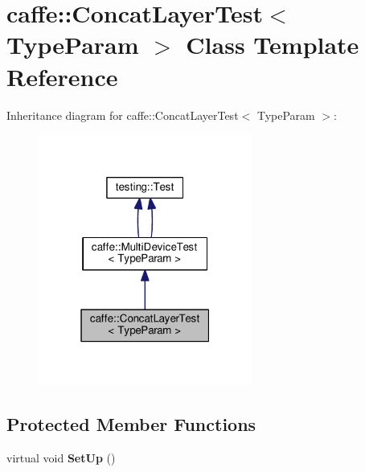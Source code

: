 \hypertarget{classcaffe_1_1_concat_layer_test}{}\section{caffe\+:\+:Concat\+Layer\+Test$<$ Type\+Param $>$ Class Template Reference}
\label{classcaffe_1_1_concat_layer_test}


Inheritance diagram for caffe\+:\+:Concat\+Layer\+Test$<$ Type\+Param $>$\+:
\nopagebreak
\begin{figure}[H]
\begin{center}
\leavevmode
\includegraphics[width=199pt]{classcaffe_1_1_concat_layer_test__inherit__graph}
\end{center}
\end{figure}
\subsection*{Protected Member Functions}
\begin{DoxyCompactItemize}
\item 
\mbox{\label{classcaffe_1_1_concat_layer_test_af369f7220dba65031559cef4178cdd8d}} 
virtual void {\bfseries Set\+Up} ()
\end{DoxyCompactItemize}
